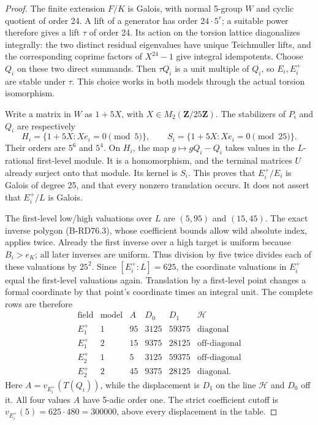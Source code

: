 \begin{proof}
The finite extension \(F/K\) is Galois, with normal 5-group \(W\) and
cyclic quotient of order 24. A lift of a generator has order
\(24\cdot5^r\); a suitable power therefore gives a lift \(\tau\) of
order 24. Its action on the torsion lattice diagonalizes integrally:
the two distinct residual eigenvalues have unique Teichmuller lifts,
and the corresponding coprime factors of \(X^{24}-1\) give integral
idempotents. Choose \(Q_i\) on these two direct summands. Then
\(\tau Q_i\) is a unit multiple of \(Q_i\), so \(E_i,E_i^+\) are
stable under \(\tau\). This choice works in both models through the
actual torsion isomorphism.

Write a matrix in \(W\) as \(1+5X\), with
\(X\in M_2(\mathbf Z/25\mathbf Z)\). The stabilizers of \(P_i\)
and \(Q_i\) are respectively
\[
 H_i=\{1+5X:X e_i=0\pmod5\},\qquad
 S_i=\{1+5X:X e_i=0\pmod{25}\}.
 \tag{B-RD90.3}
\]
Their orders are \(5^6\) and \(5^4\). On \(H_i\), the map
\(g\mapsto gQ_i-Q_i\) takes values in the \(L\)-rational first-level
module. It is a homomorphism, and the terminal matrices \(U\) already
surject onto that module. Its kernel is \(S_i\). This proves that
\(E_i^+/E_i\) is Galois of degree 25, and that every nonzero translation
occurs. It does not assert that \(E_i^+/L\) is Galois.

The first-level low/high valuations over \(L\) are \((5,95)\) and
\((15,45)\). The exact inverse polygon (B-RD76.3), whose coefficient
bounds allow wild absolute index, applies twice. Already the first
inverse over a high target is uniform because \(B_i>e_K\); all later
inverses are uniform. Thus division by five twice divides each of
these valuations by \(25^2\). Since \([E_i^+:L]=625\), the coordinate
valuations in \(E_i^+\) equal the first-level valuations again.
Translation by a first-level point changes a formal coordinate by
that point's coordinate times an integral unit. The complete rows are
therefore
\[
\begin{array}{c|c|r|r|r|c}
 \text{field}&\text{model}&A&D_0&D_1&\mathcal H\\\hline
 E_1^+&1&95&3125&59375&\text{diagonal}\\
 E_1^+&2&15&9375&28125&\text{off-diagonal}\\
 E_2^+&1&5&3125&59375&\text{off-diagonal}\\
 E_2^+&2&45&9375&28125&\text{diagonal}.
\end{array}                                                   \tag{B-RD90.4}
\]
Here \(A=v_{E_i^+}(T(Q_i))\), while the displacement is \(D_1\) on
the line \(\mathcal H\) and \(D_0\) off it. All four values \(A\)
have 5-adic order one. The strict coefficient cutoff is
\(v_{E_i^+}(5)=625\cdot480=300000\), above every displacement in
the table.


\end{proof}
